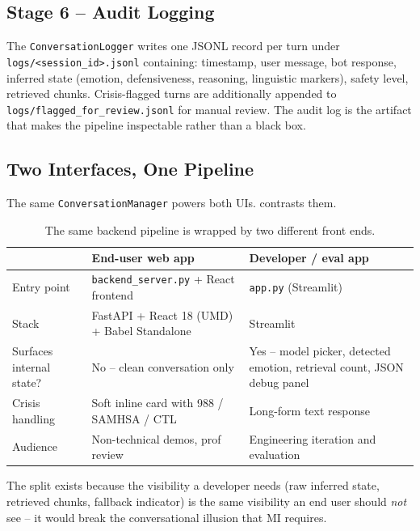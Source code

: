 \subsection{Stage 6 -- Audit Logging}

The \texttt{ConversationLogger} writes one JSONL record per turn under
\texttt{logs/<session\_id>.jsonl} containing: timestamp, user message,
bot response, inferred state (emotion, defensiveness, reasoning, linguistic
markers), safety level, retrieved chunks. Crisis-flagged turns are
additionally appended to \texttt{logs/flagged\_for\_review.jsonl} for manual
review. The audit log is the artifact that makes the pipeline inspectable
rather than a black box.

\subsection{Two Interfaces, One Pipeline}

The same \texttt{ConversationManager} powers both UIs. 
contrasts them.

\begin{table}[h]
\centering
\caption{The same backend pipeline is wrapped by two different front ends.}
\label{tab:two-ui}
\renewcommand{\arraystretch}{1.15}
\begin{tabularx}{\linewidth}{l X X}
\toprule
 & \textbf{End-user web app} & \textbf{Developer / eval app} \\
\midrule
Entry point          & \texttt{backend\_server.py} + React frontend & \texttt{app.py} (Streamlit) \\
Stack                & FastAPI + React 18 (UMD) + Babel Standalone & Streamlit \\
Surfaces internal state? & No -- clean conversation only & Yes -- model picker, detected emotion, retrieval count, JSON debug panel \\
Crisis handling      & Soft inline card with 988 / SAMHSA / CTL & Long-form text response \\
Audience             & Non-technical demos, prof review & Engineering iteration and evaluation \\
\bottomrule
\end{tabularx}
\end{table}

The split exists because the visibility a developer needs (raw inferred state,
retrieved chunks, fallback indicator) is the same visibility an end user should
\emph{not} see -- it would break the conversational illusion that MI requires.

